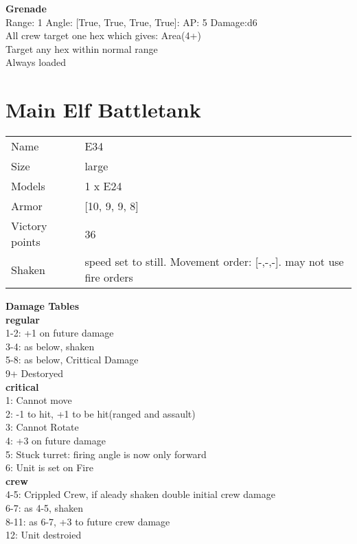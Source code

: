 {\bf Grenade } \\



Range: 1  Angle: [True, True, True, True]: AP: 5 Damage:d6 \\
All crew target one hex which gives: Area(4+)\\ 
Target any hex within normal range\\ 
Always loaded\\ 




 















\pagebreak\pagebreak

\section{ Main Elf Battletank }

\begin{tabular}{ll}
  Name & E34 \\
  Size & large\\
  Models & 1 x E24\\
  Armor & [10, 9, 9, 8]\\
  Victory points & 36\\
  Shaken & speed set to still. Movement order: [-,-,-]. may not use fire orders\\
\end{tabular}




{\bf Damage Tables} \\
 {\bf regular } \\
1-2: +1 on future damage \\
3-4: as below, shaken \\
5-8: as below, Crittical Damage \\
9+ Destoryed \\
 {\bf critical } \\
1: Cannot move \\
2: -1 to hit, +1 to be hit(ranged and assault) \\
3: Cannot Rotate \\
4: +3 on future damage \\
5: Stuck turret: firing angle is now only forward \\
6: Unit is set on Fire \\
 {\bf crew } \\
4-5: Crippled Crew, if aleady shaken double initial crew damage \\
6-7: as 4-5, shaken \\
8-11: as 6-7, +3 to future crew damage \\
12: Unit destroied \\


